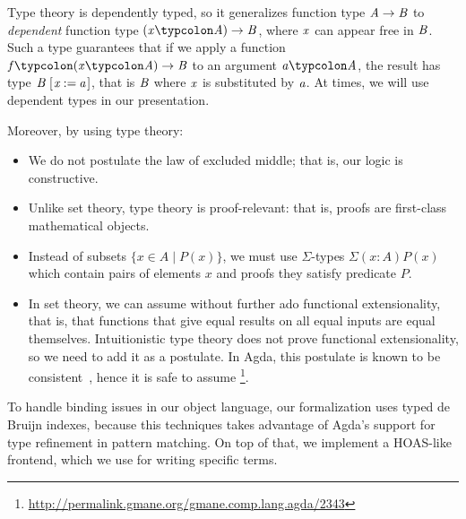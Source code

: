 Type theory is dependently typed, so it generalizes
function type \ensuremath{\Conid{A}\to \Conid{B}} to \emph{dependent} function type \ensuremath{(\Varid{x}\typcolon\Conid{A})\to \Conid{B}}, where \ensuremath{\Varid{x}} can appear free in \ensuremath{\Conid{B}}. Such a type guarantees
that if we apply a function \ensuremath{\Varid{f}\typcolon(\Varid{x}\typcolon\Conid{A})\to \Conid{B}} to an argument \ensuremath{\Varid{a}\typcolon\Conid{A}}, the result has type \ensuremath{\Conid{B}\;[\mskip1.5mu \Varid{x}\mathbin{:=}\Varid{a}\mskip1.5mu]}, that is \ensuremath{\Conid{B}} where \ensuremath{\Varid{x}}
is substituted by \ensuremath{\Varid{a}}. At times, we will use dependent types in
our presentation.

Moreover, by using type theory:
\begin{itemize}
\item We do not postulate the law of excluded middle; that is,
  our logic is constructive.
\item Unlike set theory, type theory is proof-relevant: that is,
  proofs are first-class mathematical objects.
\item Instead of subsets
  $\{x \in A \mid P(x)\}$, we must use $\Sigma$-types
  $\Sigma (x : A) P(x)$ which contain pairs of elements $x$ and
  proofs they satisfy predicate $P$.
\item In set theory, we can assume without further ado functional
  extensionality, that is, that functions that give equal results
  on all equal inputs are equal themselves. Intuitionistic type
  theory does not prove functional extensionality, so we need to
  add it as a postulate. In Agda, this postulate is known to be
  consistent~\citep{Hofmann96}, hence it is safe to assume%
  \footnote{\url{http://permalink.gmane.org/gmane.comp.lang.agda/2343}}.
\end{itemize}

To handle binding issues in our object language, our
formalization uses typed de Bruijn indexes, because this
techniques takes advantage of Agda's support for type refinement
in pattern matching. On top of that, we implement a HOAS-like
frontend, which we use for writing specific terms.


